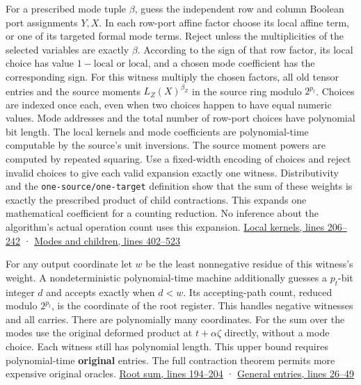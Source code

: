 \documentclass[11pt,a4paper]{article}
\begin{document}
For a prescribed mode tuple \(\beta\), guess the independent row and
column Boolean port assignments \(Y,X\). In each row-port affine factor
choose its local affine term, or one of its targeted formal mode terms.
Reject unless the multiplicities of the selected variables are exactly
\(\beta\). According to the sign of that row factor, its local choice
has value \(1-\mathrm{local}\) or \(\mathrm{local}\), and a chosen mode
coefficient has the corresponding sign. For this witness multiply the
chosen factors, all old tensor entries and the source moments
\(L_Z(X)^{\beta_Z}\) in the source ring modulo \(2^{p_t}\). Choices are
indexed once each, even when two choices happen to have equal numeric
values. Mode addresses and the total number of row-port choices have
polynomial bit length. The local kernels and mode coefficients are
polynomial-time computable by the source's unit inversions. The source
moment powers are computed by repeated squaring. Use a fixed-width
encoding of choices and reject invalid choices to give each valid
expansion exactly one witness. Distributivity and the
\nolinkurl{one-source/one-target} definition show that the sum of these
weights is exactly the prescribed product of child contractions. This
expands one mathematical coefficient for a counting reduction. No
inference about the algorithm's actual operation count uses this
expansion.
\href{https://github.com/openai/math/blob/main/preprints/The-Exponential-Time-Hypothesis-is-False-October-25-2026/build/quantitative-contraction.tex\#L206}{Local
kernels, lines 206--242} ·
\href{https://github.com/openai/math/blob/main/preprints/The-Exponential-Time-Hypothesis-is-False-October-25-2026/build/quantitative-contraction.tex\#L402}{Modes
and children, lines 402--523}

For any output coordinate let \(w\) be the least nonnegative residue of
this witness's weight. A nondeterministic polynomial-time machine
additionally guesses a \(p_t\)-bit integer \(d\) and accepts exactly
when \(d<w\). Its accepting-path count, reduced modulo \(2^{p_t}\), is
the coordinate of the root register. This handles negative witnesses and
all carries. There are polynomially many coordinates. For the sum over
the modes use the original deformed product at \(t+\alpha\zeta\)
directly, without a mode choice. Each witness still has polynomial
length. This upper bound requires polynomial-time \textbf{original}
entries. The full contraction theorem permits more expensive original
oracles.
\href{https://github.com/openai/math/blob/main/preprints/The-Exponential-Time-Hypothesis-is-False-October-25-2026/build/quantitative-contraction.tex\#L194}{Root
sum, lines 194--204} ·
\href{https://github.com/openai/math/blob/main/preprints/The-Exponential-Time-Hypothesis-is-False-October-25-2026/build/quantitative-reduction.tex\#L26}{General
entries, lines 26--49}
\end{document}

